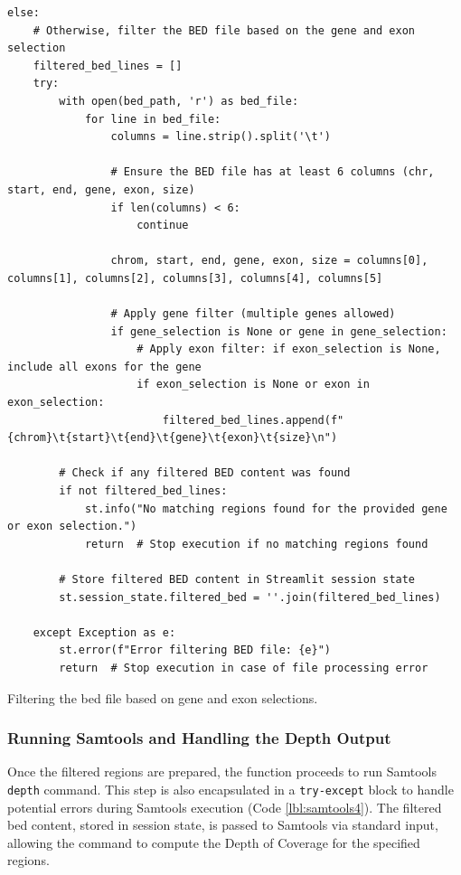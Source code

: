 \begin{longlisting}
\begin{verbatim}
else:
    # Otherwise, filter the BED file based on the gene and exon selection
    filtered_bed_lines = []
    try:
        with open(bed_path, 'r') as bed_file:
            for line in bed_file:
                columns = line.strip().split('\t')

                # Ensure the BED file has at least 6 columns (chr, start, end, gene, exon, size)
                if len(columns) < 6:
                    continue

                chrom, start, end, gene, exon, size = columns[0], columns[1], columns[2], columns[3], columns[4], columns[5]

                # Apply gene filter (multiple genes allowed)
                if gene_selection is None or gene in gene_selection:
                    # Apply exon filter: if exon_selection is None, include all exons for the gene
                    if exon_selection is None or exon in exon_selection:
                        filtered_bed_lines.append(f"{chrom}\t{start}\t{end}\t{gene}\t{exon}\t{size}\n")

        # Check if any filtered BED content was found
        if not filtered_bed_lines:
            st.info("No matching regions found for the provided gene or exon selection.")
            return  # Stop execution if no matching regions found

        # Store filtered BED content in Streamlit session state
        st.session_state.filtered_bed = ''.join(filtered_bed_lines)

    except Exception as e:
        st.error(f"Error filtering BED file: {e}")
        return  # Stop execution in case of file processing error
\end{verbatim}
\caption{Filtering the \ac{bed} file based on gene and exon selections.}
\label{lbl:samtools3}
\end{longlisting}

\subsubsection{\textbf{Running Samtools and Handling the Depth Output}}

Once the filtered regions are prepared, the function proceeds to run Samtools \texttt{depth} command. This step is also encapsulated in a \texttt{try-except} block to handle potential errors during Samtools execution (Code \ref{lbl:samtools4}). The filtered \ac{bed} content, stored in session state, is passed to Samtools via standard input, allowing the command to compute the Depth of Coverage for the specified regions.

